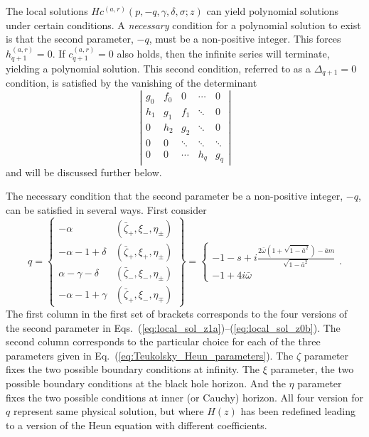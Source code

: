 \documentclass[11pt]{article}
\begin{document}
The local solutions $Hc^{(a,r)}(p,-q,\gamma,\delta,\sigma;z)$ can
yield polynomial solutions under certain conditions.  A {\em
  necessary} condition for a polynomial solution to exist is that the
second parameter, $-q$, must be a non-positive integer.  This forces
$h_{q+1}^{(a,r)}=0$.  If $c_{q+1}^{(a,r)}=0$ also holds, then the
infinite series will terminate, yielding a polynomial solution.  This
second condition, referred to as a $\Delta_{q+1}=0$ condition, is
satisfied by the vanishing of the determinant
\begin{equation}\label{eq:Delta_q_cond}
  \left|\begin{array}{ccccc}
  g_0 & f_0 & 0 & \cdots & 0 \\
  h_1 & g_1 & f_1 & \ddots & 0 \\
  0 & h_2 & g_2 & \ddots & 0 \\
  0 & 0 & \ddots & \ddots & \ddots \\
  0 & 0 & \cdots & h_q & g_q
  \end{array}\right|
\end{equation}
and will be discussed further below.

The necessary condition that the second parameter be a non-positive
integer, $-q$, can be satisfied in several ways.  First consider
\begin{equation}\label{eq:PP_boundary_set}
  q= \left\{\begin{array}{cc}
            -\alpha & (\bar\zeta_+,\xi_\minus,\eta_\pm) \\
            -\alpha-1+\delta & (\bar\zeta_+,\xi_+,\eta_\pm) \\
            \alpha-\gamma-\delta & (\bar\zeta_\minus,\xi_\minus,\eta_\pm) \\
            -\alpha-1+\gamma & (\bar\zeta_+,\xi_\minus,\eta_\mp)
  \end{array}\right\} =\left\{\begin{array}{c}
  -1-s+i\frac{2\bar\omega(1+\sqrt{1-\bar{a}^2})-\bar{a}m}{\sqrt{1-\bar{a}^2}} \\
  -1+4i\bar{\omega}
  \end{array}\right. .
\end{equation}
The first column in the first set of brackets corresponds to the four
versions of the second parameter in
Eqs.~(\ref{eq:local_sol_z1a})--(\ref{eq:local_sol_z0b}).  The second
column corresponds to the particular choice for each of the three
parameters given in Eq.~(\ref{eq:Teukolsky_Heun_parameters}).  The
$\zeta$ parameter fixes the two possible boundary conditions at
infinity.  The $\xi$ parameter, the two possible boundary conditions
at the black hole horizon.  And the $\eta$ parameter fixes the two
possible conditions at inner (or Cauchy) horizon.  All four version
for $q$ represent same physical solution, but where $H(z)$ has been
redefined leading to a version of the Heun equation with different
coefficients.
\end{document}
